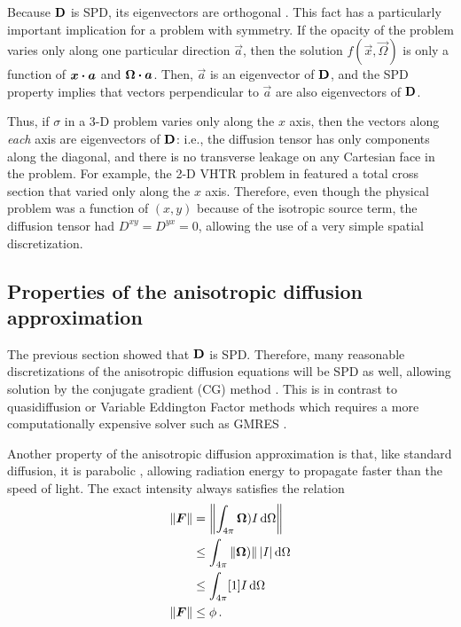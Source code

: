 Because $\mathbf{D}$ is SPD, its eigenvectors are orthogonal \cite[p.173]{Tre1997}.
This fact has a particularly important implication for a problem with symmetry.
If the opacity of the problem varies only along one particular direction
$\vec{a}$, then the
solution $f(\vec{x},\vec{\Omega})$ is only a function of $\bm{x}\bm{\cdot} \bm{a}$
and $\bm{\Omega} \bm{\cdot} \bm{a}$. Then, $\vec{a}$ is an eigenvector of $\mathbf{D}$,
and the SPD property implies that vectors perpendicular to $\vec{a}$ are also
eigenvectors of $\mathbf{D}$.

Thus, if $\sigma$ in a 3-D problem varies only along
the $x$ axis, then the vectors along \emph{each} axis are
eigenvectors of $\mathbf{D}$: i.e., the diffusion tensor has only
components along the diagonal, and there is no transverse leakage on any
Cartesian face in the problem. For example, the 2-D VHTR problem in
\cite{Lar2009c} featured a total cross section that varied only along the $x$
axis. Therefore, even though the physical problem was a function of $(x,y)$
because of the isotropic source term, the diffusion tensor had
$D^{xy}=D^{yx}=0$, allowing the use of a very simple spatial discretization.

\subsection{Properties of the anisotropic diffusion approximation}

The previous section showed that $\mathbf{D}$ is SPD. Therefore, many reasonable
discretizations of the anisotropic diffusion equations will be SPD as well,
allowing
solution by the conjugate gradient (CG) method \cite{Tre1997}. This is in
contrast to quasidiffusion or Variable Eddington Factor methods which requires a
more computationally expensive solver such as GMRES \cite{War2003}.

Another property of the anisotropic diffusion approximation is that, like
standard diffusion, it is parabolic \cite{Pom1982,Ols2000}, allowing
radiation energy to propagate faster than the speed of light. The exact
intensity always satisfies the relation
\begin{align*}
  \left\| \bm{F} \right\| &= \left\|  \int_{4\pi} \bm{\Omega}) I \mathop{}\!\mathrm{d} \Omega \right\|
  \\&\le \int_{4\pi} \left\| \bm{\Omega}) \right\| \left| I \right| \mathop{}\!\mathrm{d} \Omega 
  \\
  &\le \int_{4\pi} [1] I \mathop{}\!\mathrm{d}\Omega
  \\
  \left\| \bm{F} \right\| &\le \phi\,.
\end{align*}

